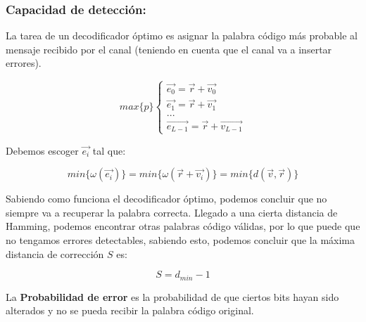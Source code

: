 \documentclass{article}
\begin{document}
\subsubsection{Capacidad de detección:}

La tarea de un decodificador óptimo es asignar la palabra código más probable al mensaje recibido por el canal (teniendo en cuenta que el canal va a insertar errores).

\begin{equation}
    max\{p\} \left\{
    \begin{array}{c}
        \vec{e_0} = \vec{r} + \vec{v_0} \\
        \vec{e_1} = \vec{r} + \vec{v_1} \\
        ... \\
        \vec{e_{L-1}} = \vec{r} + \vec{v_{L-1}} 
    \end{array}
    \right.
\end{equation}

Debemos escoger $\vec{e_i}$ tal que:

\begin{equation}
    min\{\omega(\vec{e_i})\}=
    min\{\omega(\vec{r}+\vec{v_i})\}=
    min\{d(\vec{v},\vec{r})\}
\end{equation}

Sabiendo como funciona el decodificador óptimo, podemos concluir que no siempre va a recuperar la palabra correcta. Llegado a una cierta distancia de Hamming, podemos encontrar otras palabras código válidas, por lo que puede que no tengamos errores detectables, sabiendo esto, podemos concluir que la máxima distancia de corrección $S$ es:

\begin{equation}
    S = d_{min} - 1
\end{equation}

La \textbf{Probabilidad de error} es la probabilidad de que ciertos bits hayan sido alterados y no se pueda recibir la palabra código original. 

\begin{center}
\end{center}
\end{document}

